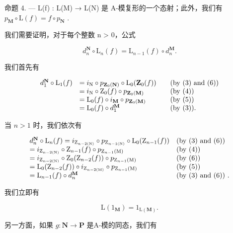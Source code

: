 命题 4. --- L(f) : L(M) → L(N) 是 A-模复形的一个态射；此外，我们有 \(p_{\mathbf{M}} \circ \mathrm{L}(f) = f \circ p_{\mathbf{N}}\) .

我们需要证明，对于每个整数 n \textgreater{} 0，公式

\[
d _ {n} ^ {\mathbf {N}} \circ \mathrm{L} _ {n} (f) = \mathrm{L} _ {n - 1} (f) \circ d _ {n} ^ {\mathbf {M}}.
\]

我们首先有

\[
\begin{array}{r l r l} d _ {1} ^ {\mathbf {N}} \circ \mathrm{L} _ {1} (f) & = i _ {\mathrm{N}} \circ p _ {\mathbf {Z} _ {0} (\mathbf {N})} \circ \mathrm{L} _ {0} (\mathbf {Z} _ {0} (f)) & & (\mathrm {by~(3)~and~(6)}) \\ & = i _ {\mathrm{N}} \circ \mathrm{Z} _ {0} (f) \circ p _ {\mathbf {Z} _ {0} (\mathbf {M})} & & (\mathrm {by~(4)}) \\ & = \mathrm{L} _ {0} (f) \circ i _ {\mathbf {M}} \circ p _ {\mathbf {Z} _ {0} (\mathbf {M})} & & (\mathrm {by~(5)}) \\ & = \mathrm{L} _ {0} (f) \circ d _ {1} ^ {\mathbf {M}} & & (\mathrm {by~(3))}. \end{array}
\]

当 \(n > 1\) 时，我们依次有

\[
\begin{array}{l l} d _ {n} ^ {\mathbf {N}} \circ \mathrm{L} _ {n} (f) = i _ {\mathrm{Z} _ {n - 2 (\mathrm{N})}} \circ p _ {\mathrm{Z} _ {n - 1 (\mathrm{N})}} \circ \mathrm{L} _ {0} (\mathrm{Z} _ {n - 1} (f)) & \text {(by (3) and (6))} \\ = i _ {\mathrm{Z} _ {n - 2 (\mathrm{N})}} \circ \mathrm{Z} _ {n - 1} (f) \circ p _ {\mathrm{Z} _ {n - 1} (\mathrm{M})} & \text {(by (4))} \\ = i _ {\mathrm{Z} _ {n - 2 (\mathrm{N})}} \circ \mathrm{Z} _ {0} (\mathrm{Z} _ {n - 2} (f)) \circ p _ {\mathrm{Z} _ {n - 1} (\mathrm{M})} & \text {(by (6))} \\ = \mathrm{L} _ {0} (\mathrm{Z} _ {n - 2} (f)) \circ i _ {\mathrm{Z} _ {n - 2 (\mathrm{M})}} \circ p _ {\mathrm{Z} _ {n - 1} (\mathrm{M})} & \text {(by (5))} \\ = \mathrm{L} _ {n - 1} (f) \circ d _ {n} ^ {\mathbf {M}} & \text {(by (3) and (6)) .} \end{array}
\]

我们立即有

\[
\mathrm{L} (1 _ {\mathbf {M}}) = 1 _ {\mathrm{L} (\mathbf {M})}.\tag{7}
\]

另一方面，如果 \(g: \mathbf{N} \to \mathbf{P}\) 是A-模的同态，我们有


